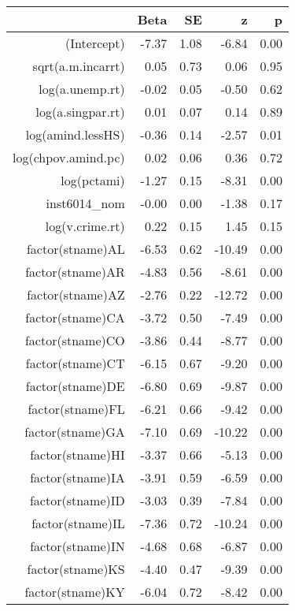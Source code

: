 \begin{table}[ht]
\centering
\begin{tabular}{rrrrr}
  \hline
 & Beta & SE & z & p \\ 
  \hline
(Intercept) & -7.37 & 1.08 & -6.84 & 0.00 \\ 
  sqrt(a.m.incarrt) & 0.05 & 0.73 & 0.06 & 0.95 \\ 
  log(a.unemp.rt) & -0.02 & 0.05 & -0.50 & 0.62 \\ 
  log(a.singpar.rt) & 0.01 & 0.07 & 0.14 & 0.89 \\ 
  log(amind.lessHS) & -0.36 & 0.14 & -2.57 & 0.01 \\ 
  log(chpov.amind.pc) & 0.02 & 0.06 & 0.36 & 0.72 \\ 
  log(pctami) & -1.27 & 0.15 & -8.31 & 0.00 \\ 
  inst6014\_nom & -0.00 & 0.00 & -1.38 & 0.17 \\ 
  log(v.crime.rt) & 0.22 & 0.15 & 1.45 & 0.15 \\ 
  factor(stname)AL & -6.53 & 0.62 & -10.49 & 0.00 \\ 
  factor(stname)AR & -4.83 & 0.56 & -8.61 & 0.00 \\ 
  factor(stname)AZ & -2.76 & 0.22 & -12.72 & 0.00 \\ 
  factor(stname)CA & -3.72 & 0.50 & -7.49 & 0.00 \\ 
  factor(stname)CO & -3.86 & 0.44 & -8.77 & 0.00 \\ 
  factor(stname)CT & -6.15 & 0.67 & -9.20 & 0.00 \\ 
  factor(stname)DE & -6.80 & 0.69 & -9.87 & 0.00 \\ 
  factor(stname)FL & -6.21 & 0.66 & -9.42 & 0.00 \\ 
  factor(stname)GA & -7.10 & 0.69 & -10.22 & 0.00 \\ 
  factor(stname)HI & -3.37 & 0.66 & -5.13 & 0.00 \\ 
  factor(stname)IA & -3.91 & 0.59 & -6.59 & 0.00 \\ 
  factor(stname)ID & -3.03 & 0.39 & -7.84 & 0.00 \\ 
  factor(stname)IL & -7.36 & 0.72 & -10.24 & 0.00 \\ 
  factor(stname)IN & -4.68 & 0.68 & -6.87 & 0.00 \\ 
  factor(stname)KS & -4.40 & 0.47 & -9.39 & 0.00 \\ 
  factor(stname)KY & -6.04 & 0.72 & -8.42 & 0.00 \\ 

\end{tabular}
\end{table}
